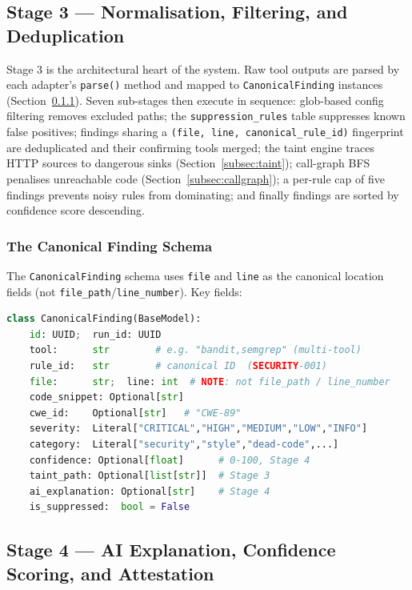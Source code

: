 \subsection{Stage 3 --- Normalisation, Filtering, and Deduplication}

Stage 3 is the architectural heart of the system. Raw tool outputs are parsed by each adapter's \texttt{parse()} method and mapped to \texttt{CanonicalFinding} instances (Section~\ref{subsec:schema}). Seven sub-stages then execute in sequence: glob-based config filtering removes excluded paths; the \texttt{suppression\_rules} table suppresses known false positives; findings sharing a \texttt{(file, line, canonical\_rule\_id)} fingerprint are deduplicated and their confirming tools merged; the taint engine traces HTTP sources to dangerous sinks (Section~\ref{subsec:taint}); call-graph BFS penalises unreachable code (Section~\ref{subsec:callgraph}); a per-rule cap of five findings prevents noisy rules from dominating; and finally findings are sorted by confidence score descending.

\subsubsection{The Canonical Finding Schema}
\label{subsec:schema}

The \texttt{CanonicalFinding} schema uses \texttt{file} and \texttt{line} as the canonical location fields (not \texttt{file\_path}/\texttt{line\_number}). Key fields:

\begin{lstlisting}[language=Python, caption={Canonical Finding Schema (Pydantic v2, key fields)}, label={lst:finding_schema}]
class CanonicalFinding(BaseModel):
    id: UUID;  run_id: UUID
    tool:      str        # e.g. "bandit,semgrep" (multi-tool)
    rule_id:   str        # canonical ID  (SECURITY-001)
    file:      str;  line: int  # NOTE: not file_path / line_number
    code_snippet: Optional[str]
    cwe_id:    Optional[str]   # "CWE-89"
    severity:  Literal["CRITICAL","HIGH","MEDIUM","LOW","INFO"]
    category:  Literal["security","style","dead-code",...]
    confidence: Optional[float]      # 0-100, Stage 4
    taint_path: Optional[list[str]]  # Stage 3
    ai_explanation: Optional[str]    # Stage 4
    is_suppressed:  bool = False
\end{lstlisting}

\subsection{Stage 4 --- AI Explanation, Confidence Scoring, and Attestation}
\label{subsec:stage4}

